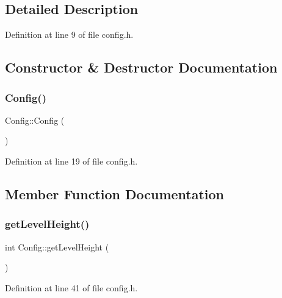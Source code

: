 \subsection{Detailed Description}


Definition at line 9 of file config.\+h.



\subsection{Constructor \& Destructor Documentation}
\hypertarget{class_config_abd0c571c116924871e30444b192b792a}{}\label{class_config_abd0c571c116924871e30444b192b792a} 
\subsubsection{\texorpdfstring{Config()}{Config()}}
{\footnotesize\ttfamily Config\+::\+Config (\begin{DoxyParamCaption}{ }\end{DoxyParamCaption})\hspace{0.3cm}{\ttfamily [inline]}}



Definition at line 19 of file config.\+h.



\subsection{Member Function Documentation}
\hypertarget{class_config_abfef8420da803d9d53af5eca645107f9}{}\label{class_config_abfef8420da803d9d53af5eca645107f9} 
\subsubsection{\texorpdfstring{get\+Level\+Height()}{getLevelHeight()}}
{\footnotesize\ttfamily int Config\+::get\+Level\+Height (\begin{DoxyParamCaption}{ }\end{DoxyParamCaption})\hspace{0.3cm}{\ttfamily [inline]}}



Definition at line 41 of file config.\+h.

\hypertarget{class_config_a9f8a9d18f378ae05cc2c0d34a659197b}{}\label{class_config_a9f8a9d18f378ae05cc2c0d34a659197b} 
